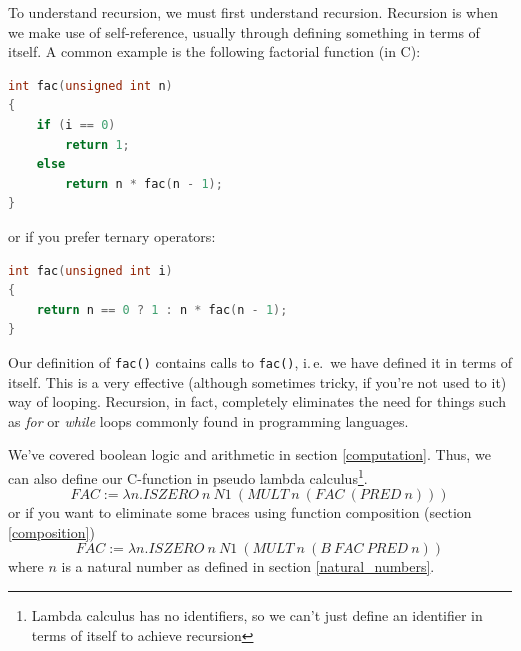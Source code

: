 \documentclass[11pt]{article}
\begin{document}
To understand recursion, we must first understand recursion. Recursion is when
we make use of self-reference, usually through defining something in terms of
itself. A common example is the following factorial function (in C):
\begin{lstlisting}[language=C]
int fac(unsigned int n)
{
	if (i == 0)
		return 1;
	else
		return n * fac(n - 1);
}
\end{lstlisting}
or if you prefer ternary operators:
\begin{lstlisting}[language=C]
int fac(unsigned int i)
{
	return n == 0 ? 1 : n * fac(n - 1);
}
\end{lstlisting}

Our definition of \texttt{fac()} contains calls to \texttt{fac()}, i.\,e.\ we
have defined it in terms of itself. This is a very effective (although
sometimes tricky, if you're not used to it) way of looping. Recursion, in fact,
completely eliminates the need for things such as \emph{for} or \emph{while}
loops commonly found in programming languages.

We've covered boolean logic and arithmetic in section \ref{computation}. Thus,
we can also define our C-function in pseudo lambda calculus\footnote{Lambda
calculus has no identifiers, so we can't just define an identifier in terms of
itself to achieve recursion}.
\[FAC:=\lambda n.ISZERO\ n\ N1\ (MULT\ n\ (FAC\ (PRED\ n)))\]
or if you want to eliminate some braces using function composition (section
\ref{composition})
\[FAC:=\lambda n.ISZERO\ n\ N1\ (MULT\ n\ (B\ FAC\ PRED\ n))\]
where \(n\) is a natural number as defined in section \ref{natural_numbers}.
\end{document}
